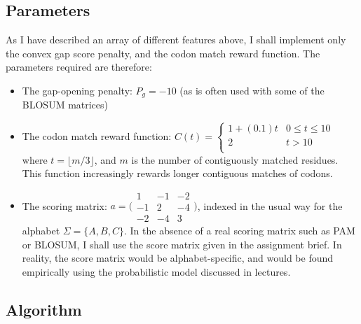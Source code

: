 \documentclass[a4paper]{article}
\begin{document}
\subsection{Parameters}
As I have described an array of different features above, I shall implement only the convex gap score penalty, and the codon match reward function. The parameters required are therefore:
\begin{itemize}
\item The gap-opening penalty: $P_g = -10$ (as is often used with some of the BLOSUM matrices)
\item The codon match reward function: $ C(t) = \begin{cases} 
      1 + (0.1)t & 0 \leq t \leq 10 \\
      2 & t > 10 \\
      \end{cases} $ where $t = \lfloor{m/3}\rfloor$, and $m$ is the number of contiguously matched residues. This function increasingly rewards longer contiguous matches of codons. 
\item The scoring matrix: $a =  \bigl( \begin{smallmatrix}1 & -1 & -2\\ -1 & 2 & -4\\ -2 & -4 & 3\end{smallmatrix}\bigr)$, indexed in the usual way for the alphabet $\Sigma = \{A, B, C\}$. In the absence of a real scoring matrix such as PAM or BLOSUM, I shall use the score matrix given in the assignment brief. In reality, the score matrix would be alphabet-specific, and would be found empirically using the probabilistic model discussed in lectures. 

\end{itemize}
\subsection{Algorithm}
\end{document}
